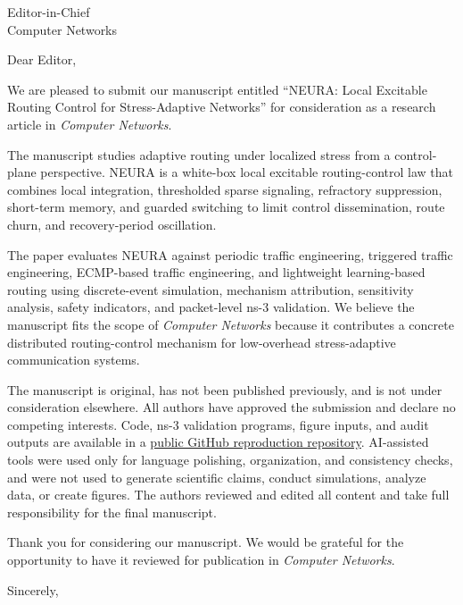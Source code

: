 \documentclass[11pt]{letter}
\date{\today}
\begin{document}
\begin{letter}{Editor-in-Chief\\Computer Networks}

\opening{Dear Editor,}

We are pleased to submit our manuscript entitled ``NEURA: Local Excitable Routing Control for Stress-Adaptive Networks'' for consideration as a research article in \emph{Computer Networks}.

The manuscript studies adaptive routing under localized stress from a control-plane perspective. NEURA is a white-box local excitable routing-control law that combines local integration, thresholded sparse signaling, refractory suppression, short-term memory, and guarded switching to limit control dissemination, route churn, and recovery-period oscillation.

The paper evaluates NEURA against periodic traffic engineering, triggered traffic engineering, ECMP-based traffic engineering, and lightweight learning-based routing using discrete-event simulation, mechanism attribution, sensitivity analysis, safety indicators, and packet-level ns-3 validation. We believe the manuscript fits the scope of \emph{Computer Networks} because it contributes a concrete distributed routing-control mechanism for low-overhead stress-adaptive communication systems.

The manuscript is original, has not been published previously, and is not under consideration elsewhere. All authors have approved the submission and declare no competing interests. Code, ns-3 validation programs, figure inputs, and audit outputs are available in a \href{https://github.com/unicorners-compin/neura-routing-artifact}{public GitHub reproduction repository}. AI-assisted tools were used only for language polishing, organization, and consistency checks, and were not used to generate scientific claims, conduct simulations, analyze data, or create figures. The authors reviewed and edited all content and take full responsibility for the final manuscript.

Thank you for considering our manuscript. We would be grateful for the opportunity to have it reviewed for publication in \emph{Computer Networks}.

\closing{Sincerely,}

\end{letter}
\end{document}
